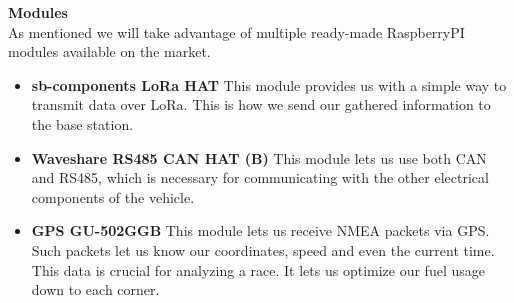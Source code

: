 \large\textbf{Modules}\\
As mentioned we will take advantage of multiple ready-made RaspberryPI modules available on the market.

\begin{itemize}
    \item[]
          \large\textbf{sb-components LoRa HAT}
          This module provides us with a simple way to transmit data over LoRa. This is how we send our gathered information to the base station.
    \item[]
          \large\textbf{Waveshare RS485 CAN HAT (B)}
          This module lets us use both CAN and RS485, which is necessary for communicating with the other electrical components of the vehicle.
    \item[]
          \large\textbf{GPS GU-502GGB}
          This module lets us receive NMEA packets via GPS. Such packets let us know our coordinates, speed and even the current time.
          This data is crucial for analyzing a race. It lets us optimize our fuel usage down to each corner.
\end{itemize}